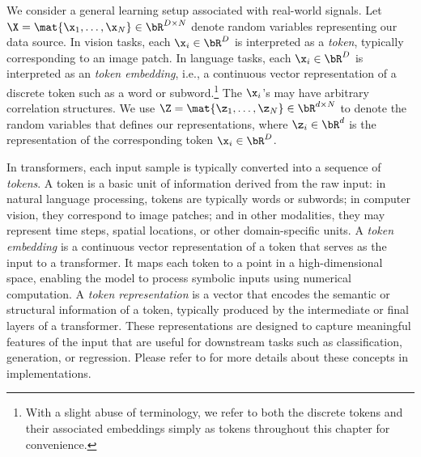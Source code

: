 \documentclass[../../book-main.tex]{subfiles}
\begin{document}
We consider a general learning setup associated with real-world signals. Let \(\X = \mat{\x_{1}, \dots, \x_{N}} \in \bR^{D \times N}\) denote random variables representing our data source. In vision tasks, each \(\x_{i} \in \bR^{D}\) is interpreted as a \textit{token}, typically corresponding to an image patch. In language tasks, each \(\x_{i} \in \bR^{D}\) is interpreted as an \textit{token embedding}, i.e., a continuous vector representation of a discrete token such as a word or subword.\footnote{With a slight abuse of terminology, we refer to both the discrete tokens and their associated embeddings simply as tokens throughout this chapter for convenience.}  %
The \(\x_{i}\)'s may have arbitrary correlation structures. We use \(\Z = \mat{\z_{1}, \dots, \z_{N}} \in \bR^{d \times N}\) to denote the random variables that defines our representations, where \(\z_{i} \in \bR^{d}\) is the representation of the corresponding token \(\x_i \in \bR^{D}\).%

\begin{remark}
    In transformers, each input sample is typically converted into a sequence of {\em tokens}. A token is a basic unit of information derived from the raw input: in natural language processing, tokens are typically words or subwords; in computer vision, they correspond to image patches; and in other modalities, they may represent time steps, spatial locations, or other domain-specific units. A {\em token embedding} is a continuous vector representation of a token that serves as the input to a transformer. It maps each token to a point in a high-dimensional space, enabling the model to process symbolic inputs using numerical computation.
    A {\em token representation} is a vector that encodes the semantic or structural information of a token, typically produced by the intermediate or final layers of a transformer. These representations are designed to capture meaningful features of the input that are useful for downstream tasks such as classification, generation, or regression. Please refer to  for more details about these concepts in implementations. 
\end{remark}


 
\end{document}
